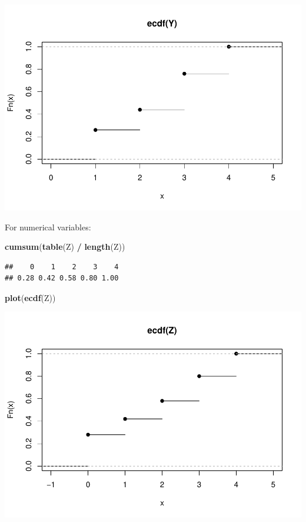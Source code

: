 \documentclass[
]{article}
\newenvironment{Shaded}{\begin{snugshade}}{\end{snugshade}}
\newcommand{\FunctionTok}[1]{\textcolor[rgb]{0.13,0.29,0.53}{\textbf{#1}}}
\newcommand{\NormalTok}[1]{#1}
\newcommand{\SpecialCharTok}[1]{\textcolor[rgb]{0.81,0.36,0.00}{\textbf{#1}}}
\begin{document}
\includegraphics{EDA_files/figure-latex/unnamed-chunk-8-1.pdf}

For numerical variables:

\begin{Shaded}
\begin{Highlighting}[]
\FunctionTok{cumsum}\NormalTok{(}\FunctionTok{table}\NormalTok{(Z) }\SpecialCharTok{/} \FunctionTok{length}\NormalTok{(Z))}
\end{Highlighting}
\end{Shaded}

\begin{verbatim}
##    0    1    2    3    4 
## 0.28 0.42 0.58 0.80 1.00
\end{verbatim}

\begin{Shaded}
\begin{Highlighting}[]
\FunctionTok{plot}\NormalTok{(}\FunctionTok{ecdf}\NormalTok{(Z))}
\end{Highlighting}
\end{Shaded}

\includegraphics{EDA_files/figure-latex/unnamed-chunk-9-1.pdf}
\end{document}
